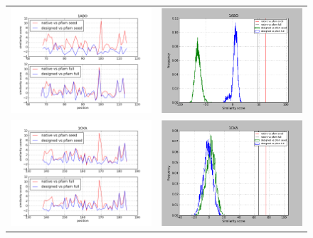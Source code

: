 \documentclass[a4paper,12pt]{article}
\begin{document}
   \begin{figure}[t]
     \centering
     \begin{tabular}{cc}
       \includegraphics[width=8.45cm]{gen_08032012/1ABO/p3/graph_simil_bypos.png} &
       \includegraphics[width=8.45cm]{gen_08032012/1ABO/p3/graph_simil_byseq.png} \\
       \includegraphics[width=8.45cm]{gen_08032012/1CKA/p3/graph_simil_bypos.png} &
       \includegraphics[width=8.45cm]{gen_08032012/1CKA/p3/graph_simil_byseq.png} \\

\end{tabular}
\end{figure}
\end{document}

